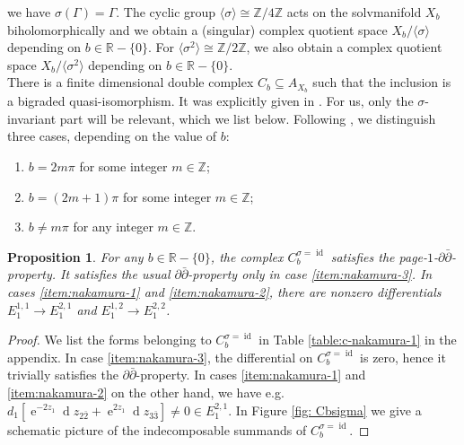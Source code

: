 \documentclass[12pt,reqno]{amsart}
\newtheorem{prop}[thm]{Proposition}
\newtheorem{cor}[thm]{Corollary}
\theoremstyle{definition}
\newcommand{\Z}{\mathbb{Z}}
\newcommand{\R}{\mathbb{R}}
\newcommand{\del}{\partial}
\newcommand{\delbar}{\bar{\del}}
\DeclareMathOperator{\id}{id}
\DeclareMathOperator{\de}{d}
\DeclareMathOperator{\esp}{e}
\begin{document}
we have $\sigma (\Gamma)=\Gamma$. The cyclic group $\langle \sigma\rangle \cong \Z/4\Z$ acts on the solvmanifold $X_{b}$ biholomorphically and we obtain a (singular) complex quotient space $X_{b}/\langle \sigma\rangle$ depending on $b\in \R-\{0\}$.
For  $\langle \sigma^{2}\rangle \cong \Z/2\Z$, we also obtain a complex quotient space $X_{b}/\langle \sigma^2\rangle$ depending on $b\in \R-\{0\}$.\\

There is a finite dimensional double complex $C_b\subseteq A_{X_b}$ such that the inclusion is a bigraded quasi-isomorphism. It was explicitly given in \cite{AK}. For us, only the $\sigma$-invariant part will be relevant, which we list below. Following \cite{AK}, we distinguish three cases, depending on the value of $b$:
\begin{enumerate}
\item\label{item:nakamura-1} $b=2m\pi$ for some integer $m\in\Z$;
\item\label{item:nakamura-2}  $b=(2m+1)\pi$ for some integer $m\in\Z$; 
\item\label{item:nakamura-3}$b\not=m\pi$ for any integer $m\in\Z$.
\end{enumerate}




\begin{prop}
For any $b\in\R-\{0\}$, the complex $C_b^{\sigma=\id}$ satisfies the page-$1$-$\del\delbar$-property. It satisfies the usual $\del\delbar$-property only in case \ref{item:nakamura-3}. In cases \ref{item:nakamura-1} and \ref{item:nakamura-2}, there are nonzero differentials $E_1^{1,1}\to E_1^{2,1}$ and $E_1^{1,2}\to E_1^{2,2}$.
\end{prop}
\begin{proof}
We list the forms belonging to $C_b^{\sigma=\id}$ in Table \ref{table:c-nakamura-1} in the appendix. In case \ref{item:nakamura-3}, the differential on $C_b^{\sigma=\id}$ is zero, hence it trivially satisfies the $\del\delbar$-property. In cases \ref{item:nakamura-1} and \ref{item:nakamura-2} on the other hand, we have e.g. $d_1[\esp^{-2z_{1}}\de z_{2\bar2}+ \esp^{2z_{1}}\de z_{3\bar3}]\neq 0\in E_1^{2,1}$. In Figure \ref{fig: Cbsigma} we give a schematic picture of the indecomposable summands of $C_b^{\sigma=\id}$.
\end{proof}
\end{document}
